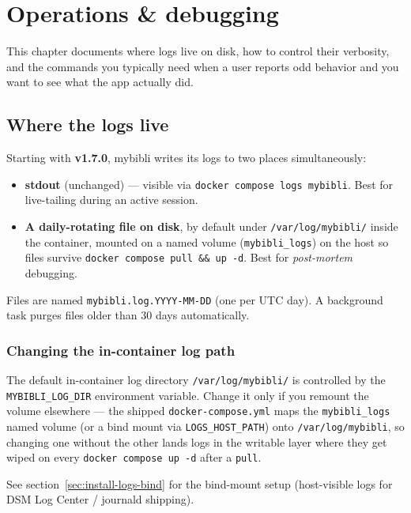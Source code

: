 \chapter{Operations \& debugging}
\label{ch:operations-debugging}

This chapter documents where logs live on disk, how to control their
verbosity, and the commands you typically need when a user reports
odd behavior and you want to see what the app actually did.

\section{Where the logs live}
\label{sec:logs-location}

Starting with \textbf{v1.7.0}, mybibli writes its logs to two places
simultaneously:

\begin{itemize}
  \item \textbf{stdout} (unchanged) — visible via
        \texttt{docker compose logs mybibli}. Best for live-tailing
        during an active session.
  \item \textbf{A daily-rotating file on disk}, by default under
        \texttt{/var/log/mybibli/} inside the container, mounted on a
        named volume (\texttt{mybibli\_logs}) on the host so files
        survive \texttt{docker compose pull \&\& up -d}. Best for
        \emph{post-mortem} debugging.
\end{itemize}

Files are named \texttt{mybibli.log.YYYY-MM-DD} (one per UTC day).
A background task purges files older than 30 days automatically.

\subsection*{Changing the in-container log path}
\label{sec:log-dir-override}

The default in-container log directory \texttt{/var/log/mybibli/} is
controlled by the \texttt{MYBIBLI\_LOG\_DIR} environment variable.
Change it only if you remount the volume elsewhere — the shipped
\texttt{docker-compose.yml} maps the \texttt{mybibli\_logs} named
volume (or a bind mount via \texttt{LOGS\_HOST\_PATH}) onto
\texttt{/var/log/mybibli}, so changing one without the other lands
logs in the writable layer where they get wiped on every
\texttt{docker compose up -d} after a \texttt{pull}.

See section~\ref{sec:install-logs-bind} for the bind-mount setup
(host-visible logs for DSM Log Center / journald shipping).

